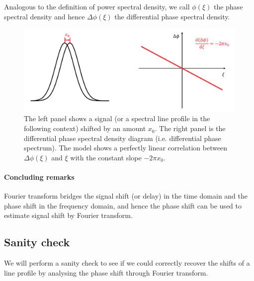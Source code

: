 Analogous to the definition of power spectral density, we call $\phi(\xi)$ the phase spectral density and hence $\Delta \phi(\xi)$ the differential phase spectral density. 

\begin{figure}[tbp]
\centering
\includegraphics[width = 0.99 \linewidth]
{./Figures/Methods/FT.png}
\caption[Translation property of Fourier transform]
{The left panel shows a signal (or a spectral line profile in the following context) shifted by an amount $x_0$. 
The right panel is the differential phase spectral density diagram (i.e. differential phase spectrum). 
The model shows a perfectly linear correlation 
between $\Delta \phi(\xi)$ and $\xi$ with the constant slope $-2 \pi x_0$.}
\label{fig:FT}
\end{figure} 

\paragraph{Concluding remarks}
Fourier transform bridges the signal shift (or delay) in the time domain and the phase shift in the frequency domain,
and hence the phase shift can be used to estimate signal shift by Fourier transform.


\subsection{Sanity check}

We will perform a sanity check to see if we could correctly recover the shifts of a line profile  
by analysing the phase shift through Fourier transform. 

